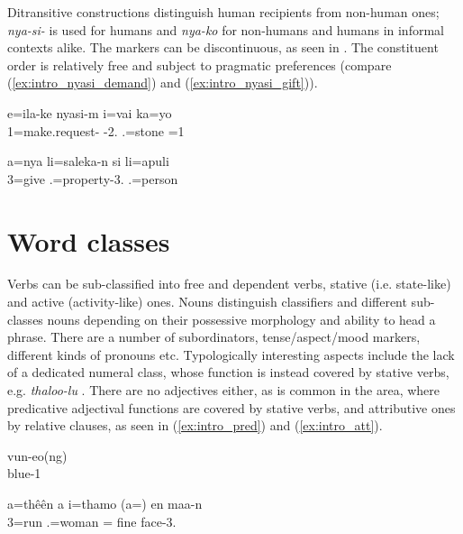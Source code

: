 \begin{sloppypar}
Ditransitive constructions distinguish human recipients from non-human ones; \textit{nya-si-}  is used for humans and \textit{nya-ko} for non-humans and humans in informal contexts alike. The markers can be discontinuous, as seen in . The constituent order is relatively free and subject to pragmatic preferences (compare (\ref{ex:intro_nyasi_demand}) and (\ref{ex:intro_nyasi_gift})).
\end{sloppypar}


\ea\label{ex:intro_nyasi_demand}
\gll e=ila-ke nyasi-m i=vai ka=yo\\
 1=make.request- -2. .=stone =1\\
\glt {}
\z


\ea\label{ex:intro_nyasi_gift}
\gll a=nya li=saleka-n si li=apuli\\
 3=give .=property-3.  .=person\\
\glt {} 
\z

\section{Word classes}

 Verbs can be sub-classified into free and dependent verbs, stative (i.e. state-like) and active (activity-like) ones. Nouns distinguish classifiers and different sub-classes nouns depending on their possessive morphology and ability to head a phrase. There are a number of subordinators, tense/aspect/mood markers, different kinds of pronouns etc. Typologically interesting aspects include the lack of a dedicated numeral class, whose function is instead covered by stative verbs, e.g. \textit{thaloo-lu}  . There are no adjectives either, as is common in the area, where predicative adjectival functions are covered by stative verbs, and attributive ones by relative clauses, as seen in (\ref{ex:intro_pred}) and (\ref{ex:intro_att}).

\ea
\label{ex:intro_pred}
\gll vun-eo(ng)\\
 blue-1\\
\glt {}
\z


\ea\label{ex:intro_att}
\gll a=thêên a i=thamo (a=) en maa-n\\
 3=run  .=woman = fine face-3.\\
\glt {}
\z

